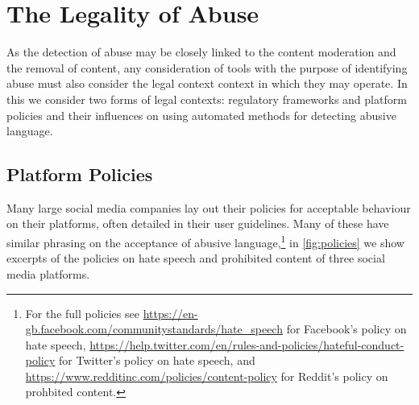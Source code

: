 \section{The Legality of Abuse}

As the detection of abuse may be closely linked to the content moderation and the removal of content, any consideration of tools with the purpose of identifying abuse must also consider the legal context context in which they may operate. In this we consider two forms of legal contexts: regulatory frameworks and platform policies and their influences on using automated methods for detecting abusive language.

\subsection{Platform Policies}

Many large social media companies lay out their policies for acceptable behaviour on their platforms, often detailed in their user guidelines. Many of these have similar phrasing on the acceptance of abusive language,\footnote{For the full policies see \url{https://en-gb.facebook.com/communitystandards/hate_speech} for Facebook's policy on hate speech, \url{https://help.twitter.com/en/rules-and-policies/hateful-conduct-policy} for Twitter's policy on hate speech, and \url{https://www.redditinc.com/policies/content-policy} for Reddit's policy on prohbited content.} in \autoref{fig:policies} we show excerpts of the policies on hate speech and prohibited content of three social media platforms.

